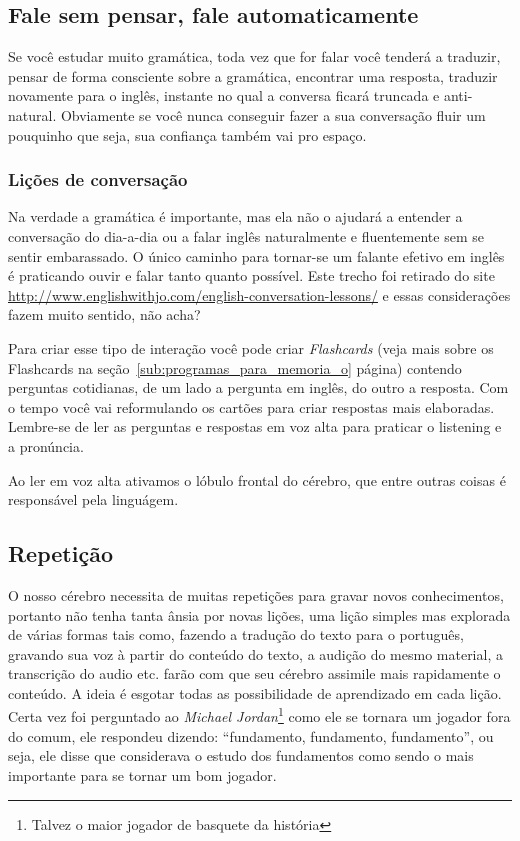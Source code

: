 \subsection{Fale sem pensar, fale automaticamente}

Se você estudar muito gramática, toda vez que for falar você tenderá
a traduzir, pensar de forma consciente sobre a gramática, encontrar uma
resposta, traduzir novamente para o inglês, instante no qual a conversa ficará
truncada e anti-natural. Obviamente se você nunca conseguir fazer a sua
conversação fluir um pouquinho que seja, sua confiança também vai pro espaço.

\subsubsection{Lições de conversação}
\label{ssub:li_es_de_conversa_o}

Na verdade a gramática é importante, mas ela não o ajudará a entender
a conversação do dia-a-dia ou a falar inglês naturalmente e
fluentemente sem se sentir embarassado. O único caminho para tornar-se
um falante efetivo em inglês é praticando ouvir e falar tanto quanto
possível. Este trecho foi retirado do site
\href{http://www.englishwithjo.com/english-conversation-lessons/}{http://www.englishwithjo.com/english-conversation-lessons/}
e essas considerações fazem muito sentido, não acha?

Para criar esse tipo de interação você pode criar \emph{Flashcards}
(veja mais sobre os Flashcards na seção~\ref{sub:programas_para_memoria_o} página\pageref{sub:programas_para_memoria_o}) contendo perguntas
cotidianas, de um lado a pergunta em inglês, do outro a resposta. Com
o tempo você vai reformulando os cartões para criar respostas mais
elaboradas. Lembre-se de ler as perguntas e respostas em voz alta para
praticar o listening e a pronúncia.

{\footnotesize {} Ao ler em voz alta ativamos o lóbulo frontal
do cérebro, que entre outras coisas é responsável pela linguágem.}



\subsection{Repetição}

O nosso cérebro necessita de muitas repetições para gravar novos conhecimentos,
portanto não tenha tanta ânsia por novas lições, uma lição simples mas
explorada de várias formas tais como, fazendo a tradução do texto para
o português, gravando sua voz à partir do conteúdo do texto, a audição do mesmo
material, a transcrição do audio etc.  farão com que seu cérebro assimile mais
rapidamente o conteúdo. A ideia é esgotar todas as possibilidade de aprendizado
em cada lição. Certa vez foi perguntado ao  {\em Michael
Jordan}\footnote{Talvez o maior jogador de basquete da história} como ele se
tornara um jogador fora do comum, ele respondeu dizendo: ``fundamento,
fundamento, fundamento'', ou seja, ele disse que considerava o estudo dos
fundamentos como sendo o mais importante para se tornar um bom jogador.

